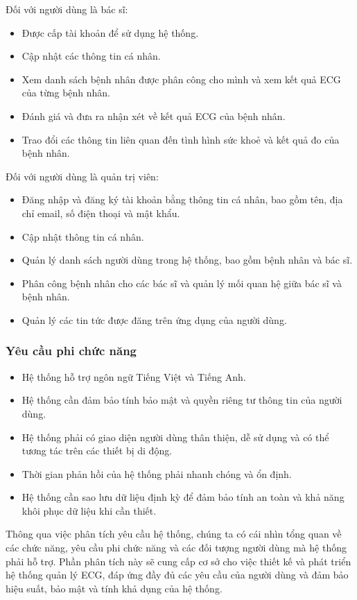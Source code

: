 \documentclass{article}%
\begin{document}
Đối với người dùng là bác sĩ:

\begin{itemize}
    \item Được cấp tài khoản để sử dụng hệ thống.
    \item Cập nhật các thông tin cá nhân.
    \item Xem danh sách bệnh nhân được phân công cho mình và xem kết quả ECG của từng bệnh nhân.
    \item Đánh giá và đưa ra nhận xét về kết quả ECG của bệnh nhân.
    \item Trao đổi các thông tin liên quan đến tình hình sức khoẻ và kết quả đo của bệnh nhân.
\end{itemize}

Đối với người dùng là quản trị viên:
\begin{itemize}
    \item Đăng nhập và đăng ký tài khoản bằng thông tin cá nhân, bao gồm tên, địa chỉ email, số điện thoại và mật khẩu.
    \item Cập nhật thông tin cá nhân.
    \item Quản lý danh sách người dùng trong hệ thống, bao gồm bệnh nhân và bác sĩ.
    \item Phân công bệnh nhân cho các bác sĩ và quản lý mối quan hệ giữa bác sĩ và bệnh nhân.
    \item Quản lý các tin tức được đăng trên ứng dụng của người dùng.
\end{itemize}

\subsubsection{Yêu cầu phi chức năng}
\begin{itemize}
    \item Hệ thống hỗ trợ ngôn ngữ Tiếng Việt và Tiếng Anh.
    \item Hệ thống cần đảm bảo tính bảo mật và quyền riêng tư thông tin của người dùng.
    \item Hệ thống phải có giao diện người dùng thân thiện, dễ sử dụng và có thể tương tác trên các thiết bị di động.
    \item Thời gian phản hồi của hệ thống phải nhanh chóng và ổn định.
    \item Hệ thống cần sao lưu dữ liệu định kỳ để đảm bảo tính an toàn và khả năng khôi phục dữ liệu khi cần thiết.
\end{itemize}

Thông qua việc phân tích yêu cầu hệ thống, chúng ta có cái nhìn tổng quan về các chức năng, yêu cầu phi chức năng và các đối tượng người dùng mà hệ thống phải hỗ trợ. Phần phân tích này sẽ cung cấp cơ sở cho việc thiết kế và phát triển hệ thống quản lý ECG, đáp ứng đầy đủ các yêu cầu của người dùng và đảm bảo hiệu suất, bảo mật và tính khả dụng của hệ thống.
\end{document}
